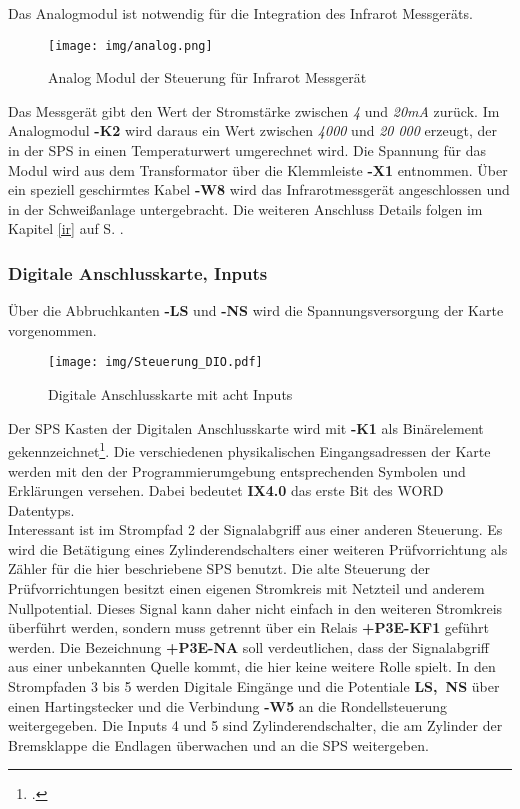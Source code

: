 \documentclass[12pt,a4paper]{scrartcl}	%
\begin{document}
Das Analogmodul ist notwendig für die Integration des Infrarot Messgeräts.
\begin{figure}[htb]
	\centering
	\texttt{[image: img/analog.png]}
	\caption{Analog Modul der Steuerung für Infrarot Messgerät}
	
\end{figure}
Das Messgerät gibt den Wert der Stromstärke zwischen \textit{4} und \textit{20mA} zurück. Im Analogmodul \mbox{\textbf{-K2}} wird daraus ein Wert zwischen \textit{4000} und \textit{20 000} erzeugt, der in der SPS in einen Temperaturwert umgerechnet wird. Die Spannung für das Modul wird aus dem Transformator über die Klemmleiste \mbox{\textbf{-X1}} entnommen. Über ein speziell geschirmtes Kabel \mbox{\textbf{-W8}} wird das Infrarotmessgerät angeschlossen und in der Schweißanlage untergebracht. Die weiteren Anschluss Details folgen im Kapitel \ref{ir} auf S. \pageref{ir}.


\subsubsection{Digitale Anschlusskarte, Inputs}
Über die Abbruchkanten \mbox{\textbf{-LS}} und \mbox{\textbf{-NS}} wird die Spannungsversorgung der Karte vorgenommen.
\begin{figure}[htb]
	\centering
	\texttt{[image: img/Steuerung\_DIO.pdf]}
	\caption{Digitale Anschlusskarte mit acht Inputs}
	
\end{figure}
Der SPS Kasten der Digitalen Anschlusskarte wird mit \mbox{\textbf{-K1}} als Binärelement gekennzeichnet\footcite[vgl.][S. 42]{grund}. Die verschiedenen physikalischen Eingangsadressen der Karte werden mit den der Programmierumgebung entsprechenden Symbolen und Erklärungen versehen. Dabei bedeutet \mbox{\textbf{IX4.0}} das erste Bit des WORD Datentyps.\\
Interessant ist im Strompfad 2 der Signalabgriff aus einer anderen Steuerung. Es wird die Betätigung eines Zylinderendschalters einer weiteren Prüfvorrichtung als Zähler für die hier beschriebene SPS benutzt. Die alte Steuerung der Prüfvorrichtungen besitzt einen eigenen Stromkreis mit Netzteil und anderem Nullpotential. Dieses Signal kann daher nicht einfach in den weiteren Stromkreis überführt werden, sondern muss getrennt über ein Relais  \mbox{\textbf{+P3E-KF1}} geführt werden. Die Bezeichnung \mbox{\textbf{+P3E-NA}} soll verdeutlichen, dass der Signalabgriff aus einer unbekannten Quelle kommt, die hier keine weitere Rolle spielt. In den Strompfaden 3 bis 5 werden Digitale Eingänge und die Potentiale \mbox{\textbf{LS, NS}} über einen Hartingstecker und die Verbindung \mbox{\textbf{-W5}} an die Rondellsteuerung weitergegeben. Die Inputs 4 und 5 sind Zylinderendschalter, die am Zylinder der Bremsklappe die Endlagen überwachen und an die SPS weitergeben. 
\end{document}
